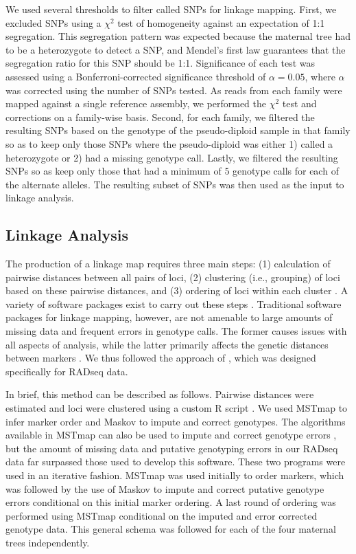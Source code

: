 \documentclass[smallextended]{svjour3}
\begin{document}
We used several thresholds to filter called SNPs for linkage mapping. First, we
excluded SNPs using a $\chi^2$ test of homogeneity against an expectation of 1:1
segregation.  This segregation pattern was expected because the maternal tree
had to be a heterozygote to detect a SNP, and Mendel's first law guarantees that
the segregation ratio for this SNP should be 1:1. Significance of each test was
assessed using a Bonferroni-corrected significance threshold of $\alpha = 0.05$,
where $\alpha$ was corrected using the number of SNPs tested. As reads from each
family were mapped against a single reference assembly, we performed the
$\chi^2$ test and corrections on a family-wise basis.  Second, for each family,
we filtered the resulting SNPs based on the genotype of the pseudo-diploid
sample in that family so as to keep only those SNPs where the pseudo-diploid was
either 1) called a heterozygote or 2) had a missing genotype call.  Lastly, we
filtered the resulting SNPs so as keep only those that had a minimum of $5$
genotype calls for each of the alternate alleles. The resulting subset of SNPs
was then used as the input to linkage analysis.

\subsection*{Linkage Analysis}\label{ss:linkage}
The production of a linkage map requires three main steps: (1)
calculation of pairwise distances between all pairs of loci, (2) clustering
(i.e., grouping) of loci based on these pairwise distances, and (3) ordering of
loci within each cluster \citep{Cheema:2009}.  A variety of software packages
exist to carry out these steps \citep[e.g.,][]{VanOoijen:2011}. Traditional
software packages for linkage mapping, however, are not amenable to large
amounts of missing data and frequent errors in genotype calls. The former causes
issues with all aspects of analysis, while the latter primarily affects the
genetic distances between markers \citep{Hackett:2003, Cartwright:2007}. We thus
followed the approach of \citet{Ward:2013}, which was designed specifically for
RADseq data.

In brief, this method can be described as follows. Pairwise distances were
estimated and loci were clustered using a custom R script \citep{R:2013}. We
used MSTmap \citep{Wu:2008a} to infer marker order and Maskov \citep{Ward:2013}
to impute and correct genotypes. The algorithms available in MSTmap can also be
used to impute and correct genotype errors \citep[see][]{Wu:2008a}, but the
amount of missing data and putative genotyping errors in our RADseq data far
surpassed those used to develop this software. These two programs were used in
an iterative fashion. MSTmap was used initially to order markers, which was
followed by the use of Maskov to impute and correct putative genotype errors
conditional on this initial marker ordering. A last round of ordering was
performed using MSTmap conditional on the imputed and error corrected genotype
data. This general schema was followed for each of the four maternal trees
independently.
\end{document}
